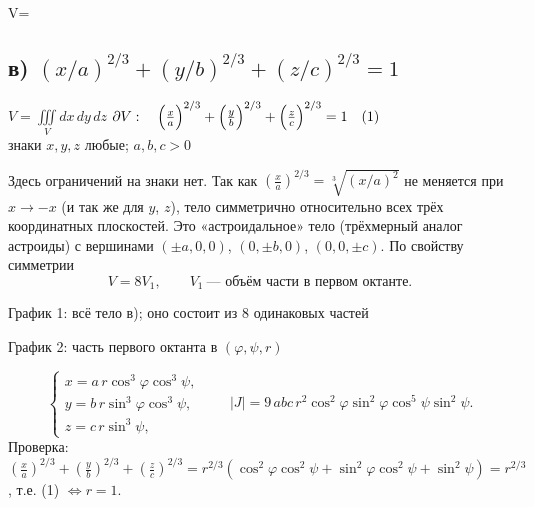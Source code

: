 \begin{answerbox}
V=
\end{answerbox}

\clearpage
\subsection*{в) $(x/a)^{2/3}+(y/b)^{2/3}+(z/c)^{2/3}=1$}

\begin{shapka}
$\displaystyle V=\iiint\limits_{V}dx\,dy\,dz$
\tcblower
$\partial V:\quad
\Bigl(\frac xa\Bigr)^{2/3}+\Bigl(\frac yb\Bigr)^{2/3}+\Bigl(\frac zc\Bigr)^{2/3}=1\quad(1)$\\[1mm]
знаки $x,y,z$ любые; $a,b,c>0$
\end{shapka}

Здесь ограничений на знаки нет. Так как $\left(\frac xa\right)^{2/3}=\sqrt[3]{(x/a)^2}$ не меняется при $x\to-x$ (и так же для $y$, $z$), тело симметрично относительно всех трёх координатных плоскостей. Это «астроидальное» тело (трёхмерный аналог астроиды) с вершинами $(\pm a,0,0)$, $(0,\pm b,0)$, $(0,0,\pm c)$. По свойству симметрии
\[
V=8V_1,\qquad V_1\ \text{--- объём части в первом октанте.}
\]

\begin{center}
\begin{minipage}[t]{0.49\linewidth}\centering
\figAstroid

\small График 1: всё тело в); оно состоит из 8 одинаковых частей
\end{minipage}\hfill
\begin{minipage}[t]{0.49\linewidth}\centering
{}

\small График 2: часть первого октанта в $(\varphi,\psi,r)$
\end{minipage}
\end{center}

\[
\begin{cases}x=a\,r\cos^3\varphi\cos^3\psi,\\ y=b\,r\sin^3\varphi\cos^3\psi,\\ z=c\,r\sin^3\psi,\end{cases}
\qquad |J|=9\,abc\,r^2\cos^2\varphi\sin^2\varphi\cos^5\psi\sin^2\psi .
\]
Проверка: $\left(\frac xa\right)^{2/3}+\left(\frac yb\right)^{2/3}+\left(\frac zc\right)^{2/3}=r^{2/3}(\cos^2\varphi\cos^2\psi+\sin^2\varphi\cos^2\psi+\sin^2\psi)=r^{2/3}$, т.е. (1) $\iff r=1$.

